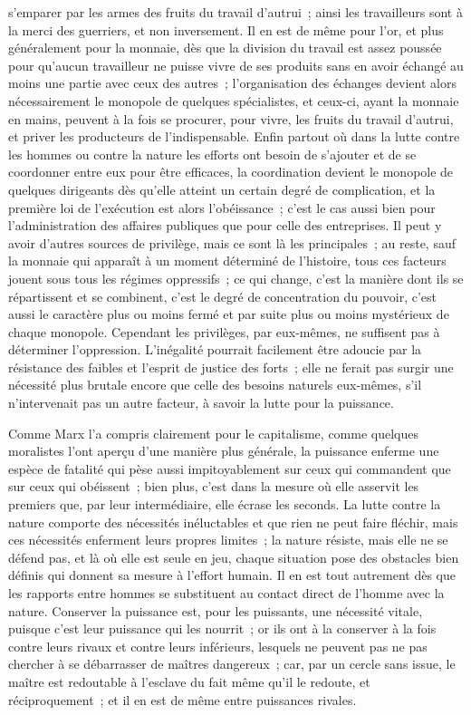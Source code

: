 \documentclass[french,twoside]{book} %
\begin{document}
s'emparer par les armes des fruits du travail d'autrui ; ainsi les travailleurs sont à la merci des guerriers, et non inversement. Il en est de même pour l'or, et plus généralement pour la monnaie, dès que la division du travail est assez poussée pour qu'aucun travailleur ne puisse vivre de ses produits sans en avoir échangé au moins une partie avec ceux des autres ; l'organisation des échanges devient alors nécessairement le monopole de quelques spécialistes, et ceux-ci, ayant la monnaie en mains, peuvent à la fois se procurer, pour vivre, les fruits du travail d'autrui, et priver les producteurs de l'indispensable. Enfin partout où dans la lutte contre les hommes ou contre la nature les efforts ont besoin de s'ajouter et de se coordonner entre eux pour être efficaces, la coordination devient le monopole de quelques dirigeants dès qu'elle atteint un certain degré de complication, et la première loi de l'exécution est alors l'obéissance ; c'est le cas aussi bien pour l'administration des affaires publiques que pour celle des entreprises. Il peut y avoir d'autres sources de privilège, mais ce sont là les principales ; au reste, sauf la monnaie qui apparaît à un moment déterminé de l'histoire, tous ces facteurs jouent sous tous les régimes oppressifs ; ce qui change, c'est la manière dont ils se répartissent et se combinent, c'est le degré de concentration du pouvoir, c'est aussi le caractère plus ou moins fermé et par suite plus ou moins mystérieux de chaque monopole. Cependant les privilèges, par eux-mêmes, ne suffisent pas à déterminer l'oppression. L'inégalité pourrait facilement être adoucie par la résistance des faibles et l'esprit de justice des forts ; elle ne ferait pas surgir une nécessité plus brutale encore que celle des besoins naturels eux-mêmes, s'il n'intervenait pas un autre facteur, à savoir la lutte pour la puissance.\par
Comme Marx l'a compris clairement pour le capitalisme, comme quelques moralistes l'ont aperçu d'une manière plus générale, la puissance enferme une espèce de fatalité qui pèse aussi impitoyablement sur ceux qui commandent que sur ceux qui obéissent ; bien plus, c'est dans la mesure où elle asservit les premiers que, par leur intermédiaire, elle écrase les seconds. La lutte contre la nature comporte des nécessités inéluctables et que rien ne peut faire fléchir, mais ces nécessités enferment leurs propres limites ; la nature résiste, mais elle ne se défend pas, et là où elle est seule en jeu, chaque situation pose des obstacles bien définis qui donnent sa mesure à l'effort humain. Il en est tout autrement dès que les rapports entre hommes se substituent au contact direct de l'homme avec la nature. Conserver la puissance est, pour les puissants, une nécessité vitale, puisque c'est leur puissance qui les nourrit ; or ils ont à la conserver à la fois contre leurs rivaux et contre leurs inférieurs, lesquels ne peuvent pas ne pas chercher à se débarrasser de maîtres dangereux ; car, par un cercle sans issue, le maître est redoutable à l'esclave du fait même qu'il le redoute, et réciproquement ; et il en est de même entre puissances rivales.\par
\end{document}
